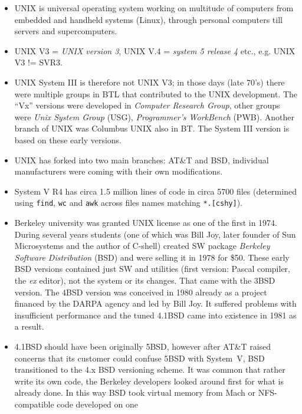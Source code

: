 \begin{itemize}
\item UNIX is universal operating system working on multitude of computers from
embedded and handheld systems (Linux), through personal computers till servers
and supercomputers.
\item UNIX V3 = \emph{UNIX version 3}, UNIX V.4 = \emph{system 5 release 4}
etc., e.g. UNIX V3 != SVR3.
\item UNIX System III is therefore not UNIX V3; in those days (late 70's) there
were multiple groups in BTL that contributed to the UNIX development.
The ``Vx'' versions were developed in \emph{Computer Research Group}, other
groups were \emph{Unix System Group} (USG), \emph{Programmer's WorkBench} (PWB).
Another branch of UNIX was Columbus UNIX also in BT. The System III version is
based on these early versions.
\item UNIX has forked into two main branches: AT\&T and BSD, individual
manufacturers were coming with their own modifications.
\item System V R4 has circa 1.5 million lines of code
in circa 5700 files (determined using \texttt{find}, \texttt{wc} and
\texttt{awk} across files names matching \texttt{*.[cshy]}).
\item Berkeley university was granted UNIX license as one of the first in
1974. During several years students (one of which was Bill Joy, later
founder of Sun Microsystems and the author of C-shell) created SW package
\emph{Berkeley Software Distribution} (BSD) and were selling it in 1978 for
\$50. These early BSD versions contained just SW and utilities (first version:
Pascal compiler, the \emph{ex} editor), not the system or its changes.
That came with the 3BSD version. The 4BSD version was conceived in 1980 already
as a project financed by the DARPA agency and led by Bill Joy. It suffered
problems with insufficient performance and the tuned 4.1BSD came into existence
in 1981 as a result.
\item 4.1BSD should have been originally 5BSD, however after AT\&T raised
concerns that its customer could confuse 5BSD with System~V, BSD transitioned to
the 4.x BSD versioning scheme. It was common that rather write its own code, the
Berkeley developers looked around first for what is already done. In this way
BSD took virtual memory from Mach or NFS-compatible code developed on one

\end{itemize}
